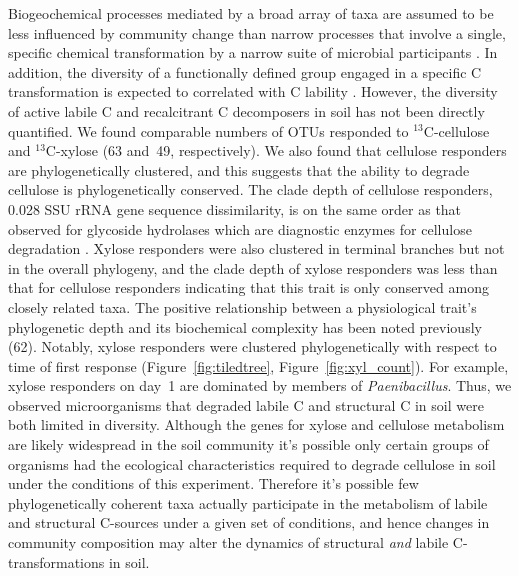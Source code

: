 Biogeochemical processes mediated by a broad array of taxa are assumed to
be less influenced by community change than narrow processes that involve
a single, specific chemical transformation by a narrow suite of microbial
participants \citep{Schimel_1995,McGuire2010}. In addition, the diversity of
a functionally defined group engaged in a specific C transformation is expected
to correlated with C lability \citep{McGuire2010}. However, the diversity of
active labile C and recalcitrant C decomposers in soil has not been directly
quantified. We found comparable numbers of OTUs responded to $^{13}$C-cellulose
and $^{13}$C-xylose (63 and~49, respectively). We also found that cellulose
responders are phylogenetically clustered, and this suggests that the ability
to degrade cellulose is phylogenetically conserved. The clade depth of
cellulose responders, 0.028 SSU rRNA gene sequence dissimilarity, is on the
same order as that observed for glycoside hydrolases which are diagnostic
enzymes for cellulose degradation \citep{Berlemont2013}. Xylose responders were
also clustered in terminal branches but not in the overall phylogeny, and the
clade depth of xylose responders was less than that for cellulose responders
indicating that this trait is only conserved among closely related taxa. The
positive relationship between a physiological trait’s phylogenetic depth and
its biochemical complexity has been noted previously (62). Notably, xylose
responders were clustered phylogenetically with respect to time of first
response (Figure~\ref{fig:tiledtree}, Figure~\ref{fig:xyl_count}). For example,
xylose responders on day~1 are dominated by members of \textit{Paenibacillus}.
Thus, we observed microorganisms that degraded labile C and structural C in
soil were both limited in diversity. Although the genes for xylose and
cellulose metabolism are likely widespread in the soil community it's possible
only certain groups of organisms had the ecological characteristics required to
degrade cellulose in soil under the conditions of this experiment. Therefore
it's possible few phylogenetically coherent taxa actually participate in the
metabolism of labile and structural C-sources under a given set of conditions,
and hence changes in community composition may alter the dynamics of structural
\textit{and} labile C-transformations in soil.

